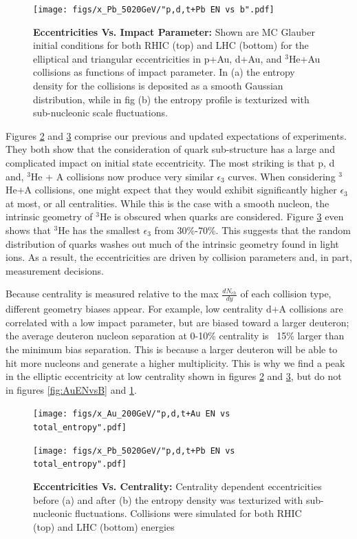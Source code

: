 \documentclass[preprint,showpacs,amsfonts,aps,prl,nofootinbib,floatfix]{revtex4}
\begin{document}
\begin{figure}
	\centering
	\texttt{[image: figs/x\_Pb\_5020GeV/"p,d,t+Pb EN vs b".pdf]}
    \caption{\textbf{Eccentricities Vs. Impact Parameter:}  Shown are MC Glauber initial conditions for both RHIC (top) and LHC (bottom) for the elliptical and triangular eccentricities in p+Au, d+Au, and $^3$He+Au collisions as functions of impact parameter. In  (a) the entropy density for the collisions is deposited as a smooth Gaussian distribution, while in fig (b) the entropy profile is texturized with sub-nucleonic scale fluctuations. }
    \label{fig:PbENvsB}
\end{figure}
Figures \ref{fig:AuENvsCent} and \ref{fig:PbENvsCent} comprise our previous and updated expectations of experiments. They both show that the consideration of quark sub-structure has a large and complicated impact on initial state eccentricity. The most striking is that p, d and, $^3$He + A collisions now produce very similar $\epsilon_3$ curves. When considering $^3$He+A collisions, one might expect that they would exhibit significantly higher $\epsilon_3$ at most, or all centralities. While this is the case with a smooth nucleon, the intrinsic geometry of $^3$He is obscured when quarks are considered. Figure \ref{fig:PbENvsCent} even shows that $^3$He has the smallest $\epsilon_3$ from 30\%-70\%. This suggests that the random distribution of quarks washes out much of the intrinsic geometry found in light ions. As a result, the eccentricities are driven by collision parameters and, in part, measurement decisions.

Because centrality is measured relative to the max $\frac{dN_{ch}}{dy}$ of each collision type, different geometry biases appear. For example, low centrality d+A collisions are correlated with a low impact parameter, but are biased toward a larger deuteron; the average deuteron nucleon separation at 0-10\% centrality is ~15\% larger than the minimum bias separation. This is because a larger deuteron will be able to hit more nucleons and generate a higher multiplicity. This is why we find a peak in the elliptic eccentricity at low centrality shown in figures \ref{fig:AuENvsCent} and \ref{fig:PbENvsCent}, but do not in figures \ref{fig:AuENvsB} and \ref{fig:PbENvsB}.
\begin{figure}[ht]
	\centering
	\texttt{[image: figs/x\_Au\_200GeV/"p,d,t+Au EN vs total\_entropy".pdf]}
	\caption{}
	\label{fig:AuENvsCent}
\end{figure} 
\begin{figure}[ht]
	\centering
	\texttt{[image: figs/x\_Pb\_5020GeV/"p,d,t+Pb EN vs total\_entropy".pdf]}
	\caption{\textbf{Eccentricities Vs. Centrality:} Centrality dependent eccentricities before (a) and after (b) the entropy density was texturized with sub-nucleonic fluctuations. Collisions were simulated for both RHIC (top) and LHC (bottom) energies}
	\label{fig:PbENvsCent}
\end{figure}
\end{document}
